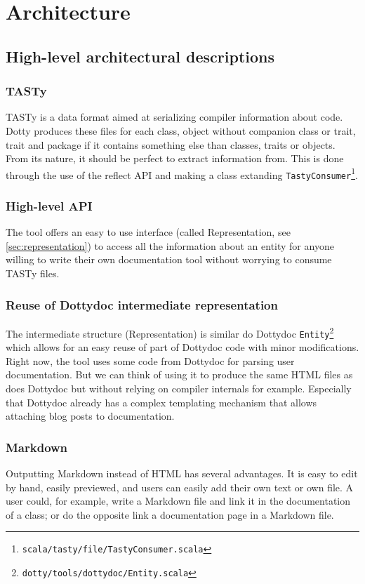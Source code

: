 \documentclass{report}
\begin{document}
\chapter{Architecture}
\section{High-level architectural descriptions}
\subsection{TASTy}
TASTy is a data format aimed at serializing compiler information about code. Dotty produces these files for each class, object without companion class or trait, trait and package if it contains something else than classes, traits or objects. From its nature, it should be perfect to extract information from.
This is done through the use of the reflect API and making a class extanding \texttt{TastyConsumer}\footnote{\texttt{scala/tasty/file/TastyConsumer.scala}}.

\subsection{High-level API}
The tool offers an easy to use interface (called Representation, see \autoref{sec:representation}) to access all the information about an entity for anyone willing to write their own documentation tool without worrying to consume TASTy files.

\subsection{Reuse of Dottydoc intermediate representation}
The intermediate structure (Representation) is similar do Dottydoc \texttt{Entity}\footnote{\texttt{dotty/tools/dottydoc/Entity.scala}} which allows for an easy reuse of part of Dottydoc code with minor modifications. Right now, the tool uses some code from Dottydoc for parsing user documentation. But we can think of using it to produce the same HTML files as does Dottydoc but without relying on compiler internals for example. Especially that Dottydoc already has a complex templating mechanism that allows attaching blog posts to documentation.

\subsection{Markdown}
Outputting Markdown instead of HTML has several advantages. It is easy to edit by hand, easily previewed, and users can easily add their own text or own file. A user could, for example, write a Markdown file and link it in the documentation of a class; or do the opposite link a documentation page in a Markdown file.
\end{document}
